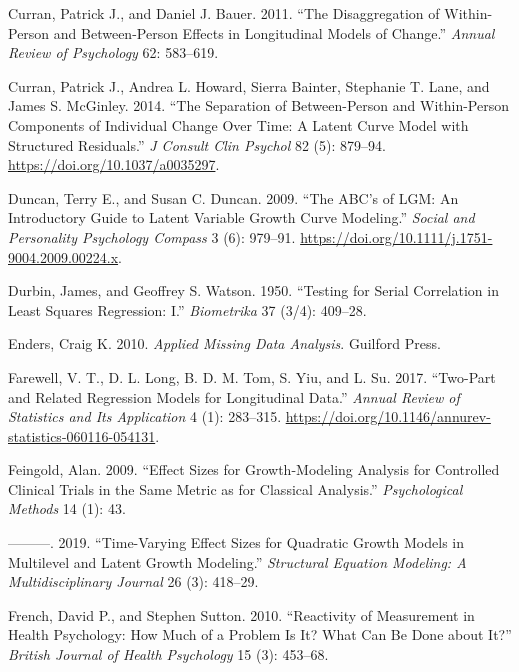 \documentclass[
  letterpaper,
  DIV=11,
  numbers=noendperiod]{scrartcl}
\newlength{\cslhangindent}
\newlength{\cslentryspacingunit} %
\newenvironment{CSLReferences}[2] %
 {%
  \setlength{\parindent}{0pt}
  \ifodd #1
  \let\oldpar\par
  \def\par{\hangindent=\cslhangindent\oldpar}
  \fi
  \setlength{\parskip}{#2\cslentryspacingunit}
 }%
 {}
\begin{document}
\begin{CSLReferences}{1}{0}
\leavevmode{}%
Curran, Patrick J., and Daniel J. Bauer. 2011. {``The Disaggregation of
Within-Person and Between-Person Effects in Longitudinal Models of
Change.''} \emph{Annual Review of Psychology} 62: 583--619.

\leavevmode{}%
Curran, Patrick J., Andrea L. Howard, Sierra Bainter, Stephanie T. Lane,
and James S. McGinley. 2014. {``The {Separation} of {Between}-Person and
{Within}-Person {Components} of {Individual} {Change} {Over} {Time}: {A}
{Latent} {Curve} {Model} with {Structured} {Residuals}.''} \emph{J
Consult Clin Psychol} 82 (5): 879--94.
\url{https://doi.org/10.1037/a0035297}.

\leavevmode{}%
Duncan, Terry E., and Susan C. Duncan. 2009. {``The {ABC}'s of {LGM}:
{An} {Introductory} {Guide} to {Latent} {Variable} {Growth} {Curve}
{Modeling}.''} \emph{Social and Personality Psychology Compass} 3 (6):
979--91. \url{https://doi.org/10.1111/j.1751-9004.2009.00224.x}.

\leavevmode{}%
Durbin, James, and Geoffrey S. Watson. 1950. {``Testing for Serial
Correlation in Least Squares Regression: {I}.''} \emph{Biometrika} 37
(3/4): 409--28.

\leavevmode{}%
Enders, Craig K. 2010. \emph{Applied {Missing} {Data} {Analysis}}.
Guilford Press.

\leavevmode{}%
Farewell, V. T., D. L. Long, B. D. M. Tom, S. Yiu, and L. Su. 2017.
{``Two-{Part} and {Related} {Regression} {Models} for {Longitudinal}
{Data}.''} \emph{Annual Review of Statistics and Its Application} 4 (1):
283--315.
\url{https://doi.org/10.1146/annurev-statistics-060116-054131}.

\leavevmode{}%
Feingold, Alan. 2009. {``Effect Sizes for Growth-Modeling Analysis for
Controlled Clinical Trials in the Same Metric as for Classical
Analysis.''} \emph{Psychological Methods} 14 (1): 43.

\leavevmode{}%
---------. 2019. {``Time-Varying Effect Sizes for Quadratic Growth
Models in Multilevel and Latent Growth Modeling.''} \emph{Structural
Equation Modeling: A Multidisciplinary Journal} 26 (3): 418--29.

\leavevmode{}%
French, David P., and Stephen Sutton. 2010. {``Reactivity of Measurement
in Health Psychology: How Much of a Problem Is It? {What} Can Be Done
about It?''} \emph{British Journal of Health Psychology} 15 (3):
453--68.


\end{CSLReferences}
\end{document}
